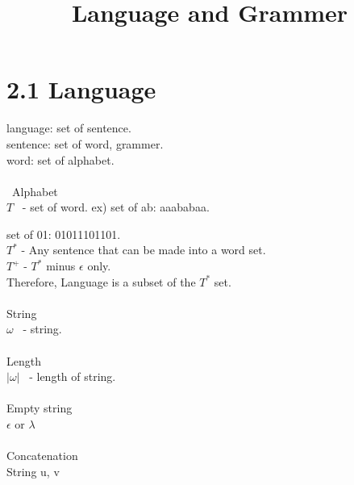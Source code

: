 \documentclass{article}
\title{Language and Grammer}
\date{}
\begin{document}
\maketitle

\section*{2.1 Language}

language: set of sentence.\\
sentence: set of word, grammer.\\
word: set of alphabet.\\ \\ 
\large\ Alphabet
\\

\large \qquad $T$ \normalsize\ - set of word. \quad  ex) set of ab: aaababaa.

\qquad\qquad\qquad\qquad\qquad\qquad\; set of 01: 01011101101.
\\

\large \qquad $T^*$ \normalsize - Any sentence that can be made into a word set.
\\

\large \qquad $T^+$ \normalsize - $T^*$ minus $\epsilon$ only.
\\

\large \qquad \large Therefore, Language is a subset of the $T^*$ set.
\\
\\

\large String
\\

\large \qquad $\omega$ \normalsize\ - string.
\\
\\

\large Length
\\

\large \qquad $|\omega|$ \normalsize\ - length of string.
\\
\\

\large Empty string
\\

\large \qquad $\epsilon$ or $\lambda$
\\
\\

\large Concatenation
\\

\large \qquad \qquad String u, v
\\
\end{document}
